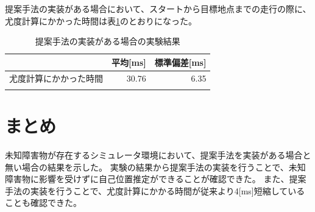 提案手法の実装がある場合において、スタートから目標地点までの走行の際に、
尤度計算にかかった時間は表\ref{tabule:likelihood_calc_time_sim_imp}のとおりになった。

\begin{table}[ht]
  \begin{center}
    \caption{提案手法の実装がある場合の実験結果}
    \label{tabule:likelihood_calc_time_sim_imp}
    \begin{tabular}{l|r|r} 
      \thline
      & 平均[ms] &  標準偏差[ms] \\
      \hline
      尤度計算にかかった時間 & 30.76 & 6.35 \\
      \thline
    \end{tabular}
  \end{center}
\end{table}

\section{まとめ}
未知障害物が存在するシミュレータ環境において、提案手法を実装がある場合と無い場合の結果を示した。
実験の結果から提案手法の実装を行うことで、未知障害物に影響を受けずに自己位置推定ができることが確認できた。
また、提案手法の実装を行うことで、尤度計算にかかる時間が従来より4[ms]短縮していることも確認できた。